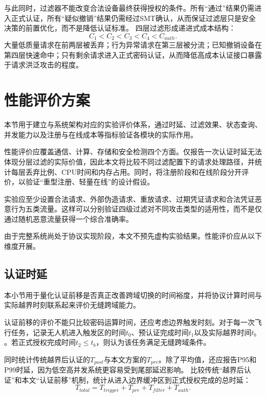 \documentclass[conference]{IEEEtran}
\begin{document}
	与此同时，过滤器不能改变合法设备最终获得授权的条件。所有“通过”结果仍需进入正式认证，所有“疑似撤销”结果仍需经过SMT确认，从而保证过滤层只是安全决策的前置优化，而不是降低认证标准。
	四层过滤形成递进式成本结构：
	\begin{equation}
		C_1<C_2<C_3<C_4<C_{auth}.
	\end{equation}
	大量低质量请求在前两层被丢弃；行为异常请求在第三层被分流；已知撤销设备在第四层快速命中；只有剩余请求进入正式密码认证，从而降低高成本认证接口暴露于请求洪泛攻击的程度。
	
	\section{性能评价方案}
	
	本节用于建立与系统架构对应的实验评价体系，通过时延、过滤效果、状态查询、并发能力以及注册与在线成本等指标验证各模块的实际作用。
	
	性能评价应覆盖通信、计算、存储和安全检测四个方面。仅报告一次认证时延无法体现分层过滤的实际价值，因此本文将比较不同过滤配置下的请求处理路径，并统计每层丢弃比例、CPU时间和内存占用。同时，将注册阶段和在线阶段分开评价，以验证“重型注册、轻量在线”的设计假设。
	
	实验应至少设置合法请求、外部伪造请求、重放请求、过期凭证请求和合法凭证恶意行为五类流量。这样可以分别验证四级过滤对不同攻击类型的适用性，而不是仅通过随机恶意流量获得一个综合准确率。
	
	由于完整系统尚处于协议实现阶段，本文不预先虚构实验结果。性能评价应从以下维度开展。
	
	\subsection{认证时延}
	
	本小节用于量化认证前移是否真正改善跨域切换的时间裕度，并将协议计算时间与实际越界时刻联系起来评价无缝跨域能力。
	
	认证前移的评价不能只比较密码运算时间，还应考虑边界触发时刻。对于每一次飞行任务，记录无人机进入触发区的时间$t_0$、预认证完成时间$t_1$以及实际越界时间$t_b$。若正式授权完成时间$t_2\le t_b$，则认为该任务满足无缝跨域条件。
	
	同时统计传统越界后认证的$T_{post}$与本文方案的$T_{pre}$。除了平均值，还应报告P95和P99时延，因为低空高并发系统更容易受到尾部延迟影响。
	比较传统“越界后认证”和本文“认证前移”机制，统计从进入边界缓冲区到正式授权完成的总时延：
	\begin{equation}
		T_{total}=T_{trigger}+T_{pre}+T_{filter}+T_{auth}.
	\end{equation}
	
\end{document}
